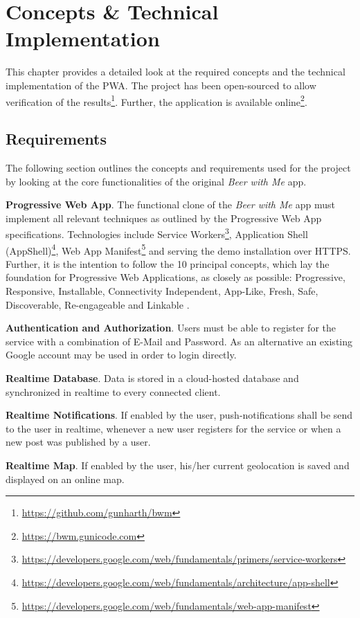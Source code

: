 \chapter{Concepts \& Technical Implementation}
This chapter provides a detailed look at the required concepts and the technical implementation of the PWA. The project has been open-sourced to allow verification of the results\footnote{\url{https://github.com/gunharth/bwm}}. Further, the application is available online\footnote{\url{https://bwm.gunicode.com}}.

\section{Requirements}

The following section outlines the concepts and requirements used for the project by looking at the core functionalities of the original \textit{Beer with Me} app.

\textbf{Progressive Web App}. The functional clone of the \textit{Beer with Me} app must implement all relevant techniques as outlined by the Progressive Web App specifications. Technologies include Service Workers\footnote{\url{https://developers.google.com/web/fundamentals/primers/service-workers}}, Application Shell (AppShell)\footnote{\url{https://developers.google.com/web/fundamentals/architecture/app-shell}}, Web App Manifest\footnote{\url{https://developers.google.com/web/fundamentals/web-app-manifest}} and serving the demo installation over HTTPS. Further, it is the intention to follow the 10 principal concepts, which lay the foundation for Progressive Web Applications, as closely as possible: Progressive, Responsive, Installable, Connectivity Independent, App-Like, Fresh, Safe, Discoverable, Re-engageable and Linkable \citep{osmaniGettingStartedProgressive2015}.

\textbf{Authentication and Authorization}. Users must be able to register for the service with a combination of E-Mail and Password. As an alternative an existing Google account may be used in order to login directly.

\textbf{Realtime Database}. Data is stored in a cloud-hosted database and synchronized in realtime to every connected client.

\textbf{Realtime Notifications}. If enabled by the user, push-notifications shall be send to the user in realtime, whenever a new user registers for the service or when a new post was published by a user.

\textbf{Realtime Map}. If enabled by the user, his/her current geolocation is saved and displayed on an online map.


